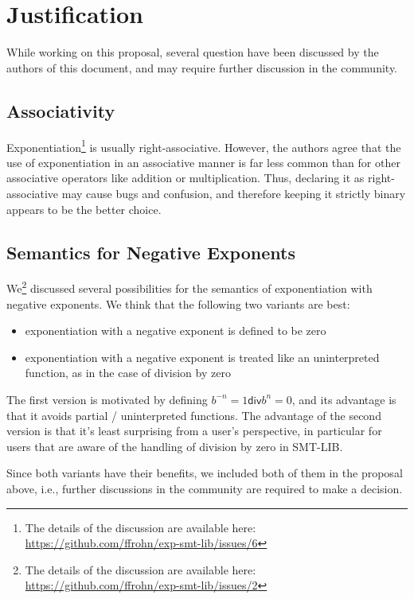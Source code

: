 \documentclass{article}
\begin{document}
\section{Justification}

While working on this proposal, several question have been discussed by the authors of this document, and may require further discussion in the community.

\subsection{Associativity}

Exponentiation\footnote{The details of the discussion are available here: \url{https://github.com/ffrohn/exp-smt-lib/issues/6}} is usually right-associative.
%
However, the authors agree that the use of exponentiation in an associative manner is far less common than for other associative operators like addition or multiplication.
%
Thus, declaring it as right-associative may cause bugs and confusion, and therefore keeping it strictly binary appears to be the better choice.

\subsection{Semantics for Negative Exponents}

We\footnote{The details of the discussion are available here: \url{https://github.com/ffrohn/exp-smt-lib/issues/2}} discussed several possibilities for the semantics of exponentiation with negative exponents.
%
We think that the following two variants are best:
%
\begin{itemize}
\item exponentiation with a negative exponent is defined to be zero
\item exponentiation with a negative exponent is treated like an uninterpreted function, as in the case of division by zero
\end{itemize}
%
The first version is motivated by defining $b^{-n} = 1 \mathrel{\mathsf{div}} b^n = 0$, and its advantage is that it avoids partial / uninterpreted functions.
%
The advantage of the second version is that it's least surprising from a user's perspective, in particular for users that are aware of the handling of division by zero in SMT-LIB.

Since both variants have their benefits, we included both of them in the proposal above, i.e., further discussions in the community are required to make a decision.
\end{document}
